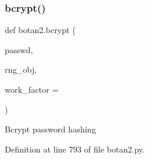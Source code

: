 \subsubsection{\texorpdfstring{bcrypt()}{bcrypt()}}
{\footnotesize\ttfamily def botan2.\+bcrypt (\begin{DoxyParamCaption}\item[{}]{passwd,  }\item[{}]{rng\+\_\+obj,  }\item[{}]{work\+\_\+factor = {} }\end{DoxyParamCaption})}

\begin{DoxyVerb}Bcrypt password hashing
\end{DoxyVerb}
 

Definition at line 793 of file botan2.\+py.

